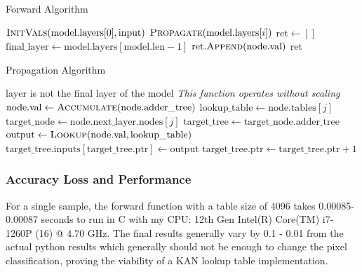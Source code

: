 \documentclass{article}
\begin{document}
\begin{algorithm}[H]
    \caption{Forward Algorithm}
    \label{alg:forward}
    \begin{algorithmic}[1]
            \State $\Call{InitVals}{\text{model}.\text{layers}[0], \text{input}}$
                \State $\Call{Propagate}{\text{model}.\text{layers}[i]}$
            \EndFor
            \State $\text{ret} \gets []$
            \State $\text{final\_layer} \gets \text{model}.\text{layers}[\text{model}.\text{len} - 1]$
                \State $\text{ret}.\Call{Append}{\text{node}.\text{val}}$
            \EndFor
            \State \Return $\text{ret}$
        \EndFunction
    \end{algorithmic}
\end{algorithm}

\begin{algorithm}[H]
    \caption{Propagation Algorithm}
    \label{alg:propagate}
    \begin{algorithmic}[1]
        \Require $\text{layer}$ is not the final layer of the model
        \Statex \textit{This function operates without scaling}
                \State $\text{node}.\text{val} \gets \Call{Accumulate}{\text{node}.\text{adder\_tree}}$
                    \State $\text{lookup\_table} \gets \text{node}.\text{tables}[j]$
                    \State $\text{target\_node} \gets \text{node}.\text{next\_layer}.\text{nodes}[j]$
                    \State $\text{target\_tree} \gets \text{target\_node}.\text{adder\_tree}$
                    \State $\text{output} \gets \Call{Lookup}{\text{node}.\text{val}, \text{lookup\_table}}$
                    \State $\text{target\_tree}.\text{inputs}[\text{target\_tree}.\text{ptr}] \gets \text{output}$
                    \State $\text{target\_tree}.\text{ptr} \gets \text{target\_tree}.\text{ptr} + 1$
                \EndFor
            \EndFor
        \EndFunction
    \end{algorithmic}
\end{algorithm}


\subsubsection{Accuracy Loss and Performance}
For a single sample, the forward function with a table size of 4096 takes 0.00085-0.00087 seconds to run in C with my CPU: 12th Gen Intel(R) Core(TM) i7-1260P (16) @ 4.70 GHz. The final results generally vary by 0.1 - 0.01 from the actual python results which generally should not be enough to change the pixel classification, proving the viability of a KAN lookup table implementation.
\end{document}

